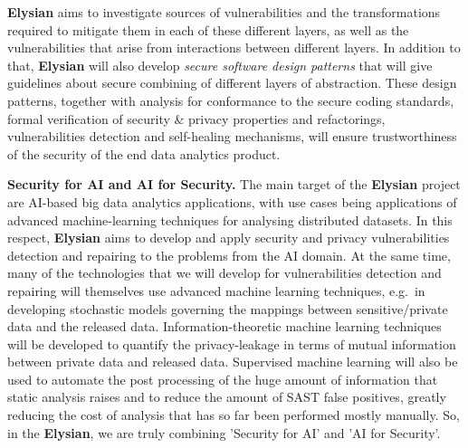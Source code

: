 \documentclass[a4paper,11pt]{article}
\newcommand{\project}[1]{\textbf{#1}\xspace}
\newcommand{\SECURITY}{\project{Elysian}}
\newcommand{\TheProject}{\SECURITY}
\begin{document}
\TheProject{} aims to investigate sources of vulnerabilities and the transformations required to mitigate them in each of these different layers, as well as the vulnerabilities that arise from interactions between different layers. In addition to that, \TheProject{} will also develop \emph{secure software design patterns} that will give guidelines about secure combining of different layers of abstraction. These design patterns, together with analysis for conformance to the secure coding standards, formal verification of security \& privacy properties and refactorings, vulnerabilities detection and self-healing mechanisms, will ensure trustworthiness of the security 
of the end data analytics product.

\begin{mdframed}[backgroundcolor=blue!5]
\textbf{Security for AI and AI for Security.}
The main target of the \TheProject{} project are AI-based big data analytics applications, with use cases being applications of advanced machine-learning techniques for analysing distributed datasets. In this respect, \TheProject{} aims to develop and apply security and privacy vulnerabilities detection and repairing to the problems from the AI domain. At the same time, many of the technologies that we will develop for vulnerabilities detection and repairing will themselves use advanced machine learning techniques, e.g.~in developing stochastic models governing the mappings between sensitive/private data and the released data. Information-theoretic machine learning techniques will be developed to quantify the privacy-leakage in terms of mutual information between private data and released data. Supervised machine learning will also be used to automate the post processing of the huge amount of information that static analysis raises and to reduce the amount of SAST false positives, greatly reducing the cost of analysis that has so far been performed mostly manually. So, in the \TheProject{}, we are truly combining 'Security for AI' and 'AI for Security'.
\end{mdframed}
\end{document}
